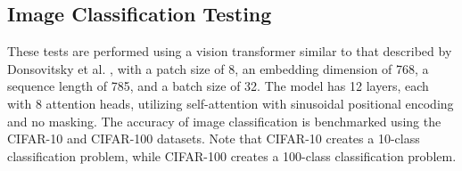 \documentclass{article}
\begin{document}
\subsection{Image Classification Testing}
\label{subsec:image_classification_results}

These tests are performed using a vision transformer similar to that described by Donsovitsky et al. \cite{dosovitskiy2020image}, with a patch size of 8, an embedding dimension of 768, a sequence length of 785, and a batch size of 32. The model has 12 layers, each with 8 attention heads, utilizing self-attention with sinusoidal positional encoding and no masking. The accuracy of image classification is benchmarked using the CIFAR-10 and CIFAR-100 datasets. Note that CIFAR-10 creates a 10-class classification problem, while CIFAR-100 creates a 100-class classification problem.

\begin{table}[h!]
    \centering
    \caption{Validation accuracy after 350 training epochs on CIFAR-10.}
    \label{tab:accuracy_results}
\end{table}

\begin{table}[h!]
    \centering
    \caption{Validation accuracy after 350 training epochs on CIFAR-100.}
    \label{tab:accuracy_results_cifar100}
\end{table}
\end{document}
